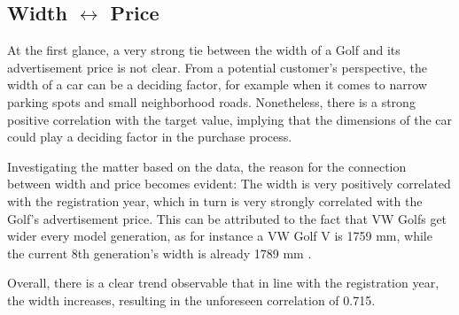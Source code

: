 \subsection{Width $\leftrightarrow$ Price}
At the first glance, a very strong tie between the width of a Golf and its advertisement price is not clear.
From a potential customer's perspective, the width of a car can be a deciding factor, for example when it comes to
narrow parking spots and small neighborhood roads.
Nonetheless, there is a strong positive correlation with the target value, implying that the dimensions of the car
could play a deciding factor in the purchase process.
\par
Investigating the matter based on the data, the reason for the connection between width and price becomes evident:
The width is very positively correlated with the registration year, which in turn is very strongly correlated with the Golf's advertisement price.
This can be attributed to the fact that VW Golfs get wider every model generation, as for instance a VW Golf V is 1759 mm,
while the current 8th generation's width is already 1789 mm \autocite{VolkswagenGolfTechnical}.
\par
Overall, there is a clear trend observable that in line with the registration year, the width increases,
resulting in the unforeseen correlation of 0.715.

